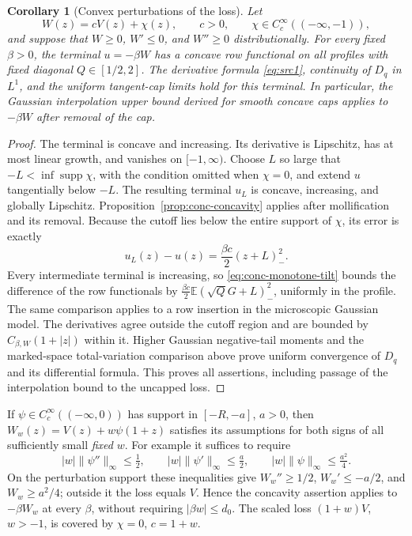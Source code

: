 \documentclass[11pt,a4paper]{article}
\numberwithin{equation}{section}
\newtheorem{corollary}[theorem]{Corollary}
\theoremstyle{definition}
\theoremstyle{remark}
\newcommand{\E}{\mathbb E}
\DeclareMathOperator{\supp}{supp}
\begin{document}
\begin{corollary}[Convex perturbations of the loss]
\label{cor:conc-convex-loss}
Let
\[
 W(z)=cV(z)+\chi(z),\qquad c>0,\qquad
 \chi\in C_c^\infty((-\infty,-1)),
\]
and suppose that $W\geq0$, $W'\leq0$, and $W''\geq0$ distributionally.
For every fixed $\beta>0$, the terminal $u=-\beta W$ has a concave row
functional on all profiles with fixed diagonal $Q\in[1/2,2]$.
The derivative formula \eqref{eq:src1}, continuity of $D_q$ in $L^1$, and
the uniform tangent-cap limits hold for this terminal.  In particular,
the Gaussian interpolation upper bound derived for smooth concave caps
applies to $-\beta W$ after removal of the cap.
\end{corollary}

\begin{proof}
The terminal is concave and increasing.  Its derivative is Lipschitz,
has at most linear growth, and vanishes on $[-1,\infty)$.
Choose $L$ so large that $-L<\inf\supp\chi$, with the condition omitted
when $\chi=0$, and extend $u$ tangentially below $-L$.
The resulting terminal $u_L$ is concave, increasing, and globally
Lipschitz.  Proposition~\ref{prop:conc-concavity} applies after
mollification and its removal.  Because the cutoff lies below the entire
support of $\chi$, its error is exactly
\[
 u_L(z)-u(z)=\frac{\beta c}{2}(z+L)_-^2.
\]
Every intermediate terminal is increasing, so
\eqref{eq:conc-monotone-tilt} bounds the difference of the row functionals
by $\frac{\beta c}{2}\E(\sqrt QG+L)_-^2$, uniformly in the profile.
The same comparison applies to a row insertion in the microscopic
Gaussian model.  The derivatives agree outside the cutoff region and
are bounded by $C_{\beta,W}(1+|z|)$ within it.  Higher Gaussian
negative-tail moments and the marked-space total-variation comparison
above prove uniform convergence of $D_q$ and its differential formula.
This proves all assertions, including passage of the interpolation bound
to the uncapped loss.
\end{proof}

If
$\psi\in C_c^\infty((-\infty,0))$ has support in $[-R,-a]$, $a>0$,
then $W_w(z)=V(z)+w\psi(1+z)$ satisfies its assumptions for both signs
of all sufficiently small \emph{fixed} $w$.  For example it suffices to
require
\[
 |w|\|\psi''\|_\infty\leq\tfrac12,\qquad
 |w|\|\psi'\|_\infty\leq\tfrac a2,\qquad
 |w|\|\psi\|_\infty\leq\tfrac{a^2}{4}.
\]
On the perturbation support these inequalities give
$W_w''\geq1/2$, $W_w'\leq-a/2$, and $W_w\geq a^2/4$; outside it
the loss equals $V$.  Hence the concavity assertion applies to
$-\beta W_w$ at every $\beta$, without requiring $|\beta w|\leq d_0$.
The scaled loss $(1+w)V$, $w>-1$, is covered by $\chi=0$, $c=1+w$.
\end{document}
